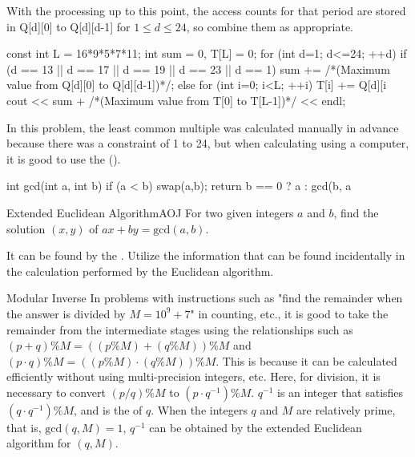 \begin{versionbeta}
With the processing up to this point, the access counts for that period are stored in Q[d][0] to Q[d][d-1] for $1\le d \le 24$, so combine them as appropriate.

\begin{cbox}
const int L = 16*9*5*7*11;
        int sum = 0, T[L] = {0};
        for (int d=1; d<=24; ++d) {
            if (d == 13 || d == 17 || d == 19 || d == 23 || d == 1)
                sum += /*(Maximum value from Q[d][0] to Q[d][d-1])*/;
            else
                for (int i=0; i<L; ++i) T[i] += Q[d][i%
        }
        cout << sum + /*(Maximum value from T[0] to T[L-1])*/ << endl;
\end{cbox}


In this problem, the least common multiple was calculated manually in advance because there was a constraint of 1 to 24, but when calculating using a computer, it is good to use the  (\pccbook[pp.~107--]).

\begin{cbox}
int gcd(int a, int b) {
  if (a < b) swap(a,b);
  return b == 0 ? a : gcd(b, a%
}
\end{cbox}

\begin{pbox}{Extended Euclidean Algorithm}{AOJ}
For two given integers $a$ and $b$, find the  solution $(x,y)$ of $ax+by=\mbox{gcd}(a,b)$.

\end{pbox}
It can be found by the .
Utilize the information that can be found incidentally in the calculation performed by the Euclidean algorithm.

\begin{tipsbox}{Modular Inverse}
In problems with instructions such as "find the remainder when the answer is divided by $M=10^9+7$" in counting, etc., it is good to take the remainder from the intermediate stages using the relationships such as $(p+q)\%M = ((p\%M)+(q\%M))\%M$ and $(p\cdot q)\%M = ((p\%M)\cdot(q\% M))\%M$. This is because it can be calculated efficiently without using multi-precision integers, etc. Here, for division, it is necessary to convert $(p/q)\%M$ to $(p\cdot q^{-1})\%M$. $q^{-1}$ is an integer that satisfies $(q\cdot q^{-1})\%M$, and is the  of $q$. When the integers $q$ and $M$ are relatively prime, that is, $\text{gcd}(q,M)=1$, $q^{-1}$ can be obtained by the extended Euclidean algorithm for $(q,M)$.
\end{tipsbox}


\end{versionbeta}
